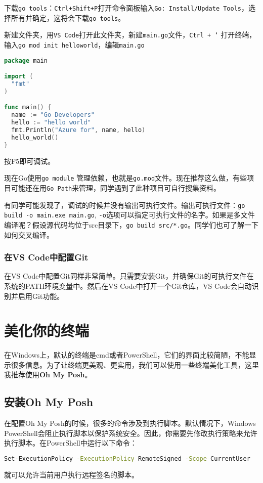 \documentclass[../main.tex]{subfiles}
\begin{document}
下载\texttt{go tools}：\texttt{Ctrl+Shift+P}打开命令面板输入\texttt{Go: Install/Update Tools}，选择所有并确定，这将会下载\texttt{go tools}。

新建文件夹，用\texttt{VS Code}打开此文件夹，新建\texttt{main.go}文件，\texttt{Ctrl + `} 打开终端，输入\texttt{go mod init helloworld}，编辑\texttt{main.go}

\begin{lstlisting}[language=go]
package main

import (
  "fmt"
)

func main() {
  name := "Go Developers"
  hello := "hello world"
  fmt.Println("Azure for", name, hello)
  hello_world()
}
\end{lstlisting}

按F5即可调试。

\begin{note}
  现在Go使用\texttt{go module} 管理依赖，也就是\texttt{go.mod}文件。现在推荐这么做，有些项目可能还在用\texttt{Go Path}来管理，同学遇到了此种项目可自行搜集资料。
\end{note}

有同学可能发现了，调试的时候并没有输出可执行文件。输出可执行文件：\texttt{go build -o main.exe main.go}, \texttt{-o}选项可以指定可执行文件的名字。如果是多文件编译呢？假设源代码均位于src目录下，\texttt{go build src/*.go}。同学们也可了解一下如何交叉编译。

\subsubsection{在VS Code中配置Git}

在VS Code中配置Git同样非常简单。只需要安装Git，并确保Git的可执行文件在系统的PATH环境变量中。然后在VS Code中打开一个Git仓库，VS Code会自动识别并启用Git功能。

\section{美化你的终端}

在Windows上，默认的终端是cmd或者PowerShell，它们的界面比较简陋，不能显示很多信息。为了让终端更美观、更实用，我们可以使用一些终端美化工具，这里我推荐使用\textbf{Oh My Posh}。

\subsection{安装Oh My Posh}

\begin{tip}
  在配置Oh My Posh的时候，很多的命令涉及到执行脚本。默认情况下，Windows PowerShell会阻止执行脚本以保护系统安全。因此，你需要先修改执行策略来允许执行脚本。在PowerShell中运行以下命令：
\begin{lstlisting}[language=bash]
  Set-ExecutionPolicy -ExecutionPolicy RemoteSigned -Scope CurrentUser
\end{lstlisting}
  就可以允许当前用户执行远程签名的脚本。
\end{tip}
\end{document}
